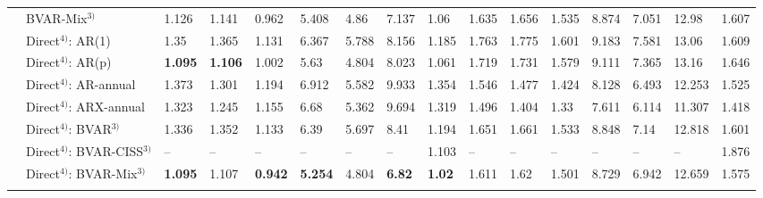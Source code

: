 \begin{table}[!h]
\begin{tabular}[t]{llllllllllllllll}
 & BVAR-Mix$^{3)}$ & 1.126 & 1.141 & 0.962 & 5.408 & 4.86 & 7.137 & 1.06 & 1.635 & 1.656 & 1.535 & 8.874 & 7.051 & 12.98 & 1.607\\
 & Direct$^{4)}$: AR(1) & 1.35 & 1.365 & 1.131 & 6.367 & 5.788 & 8.156 & 1.185 & 1.763 & 1.775 & 1.601 & 9.183 & 7.581 & 13.06 & 1.609\\
 & Direct$^{4)}$: AR(p) & \textbf{1.095} & \textbf{1.106} & 1.002 & 5.63 & 4.804 & 8.023 & 1.061 & 1.719 & 1.731 & 1.579 & 9.111 & 7.365 & 13.16 & 1.646\\
 & Direct$^{4)}$: AR-annual & 1.373 & 1.301 & 1.194 & 6.912 & 5.582 & 9.933 & 1.354 & 1.546 & 1.477 & 1.424 & 8.128 & 6.493 & 12.253 & 1.525\\
 & Direct$^{4)}$: ARX-annual & 1.323 & 1.245 & 1.155 & 6.68 & 5.362 & 9.694 & 1.319 & 1.496 & 1.404 & 1.33 & 7.611 & 6.114 & 11.307 & 1.418\\
 & Direct$^{4)}$: BVAR$^{3)}$ & 1.336 & 1.352 & 1.133 & 6.39 & 5.697 & 8.41 & 1.194 & 1.651 & 1.661 & 1.533 & 8.848 & 7.14 & 12.818 & 1.601\\
 & Direct$^{4)}$: BVAR-CISS$^{3)}$ & -- & -- & -- & -- & -- & -- & 1.103 & -- & -- & -- & -- & -- & -- & 1.876\\
 & Direct$^{4)}$: BVAR-Mix$^{3)}$ & \textbf{1.095} & 1.107 & \textbf{0.942} & \textbf{5.254} & 4.804 & \textbf{6.82} & \textbf{1.02} & 1.611 & 1.62 & 1.501 & 8.729 & 6.942 & 12.659 & 1.575\\
\cellcolor{gray!15}{} & \cellcolor{gray!15}{Simple Ensemble$^{5)}$} & \cellcolor{gray!15}{1.18} & \cellcolor{gray!15}{1.196} & \cellcolor{gray!15}{0.993} & \cellcolor{gray!15}{5.617} & \cellcolor{gray!15}{5.072} & \cellcolor{gray!15}{7.168} & \cellcolor{gray!15}{1.069} & \cellcolor{gray!15}{1.509} & \cellcolor{gray!15}{1.53} & \cellcolor{gray!15}{1.403} & \cellcolor{gray!15}{8.122} & \cellcolor{gray!15}{6.436} & \cellcolor{gray!15}{11.922} & \cellcolor{gray!15}{1.455}\\
\bottomrule
\end{tabular}
\end{table}
